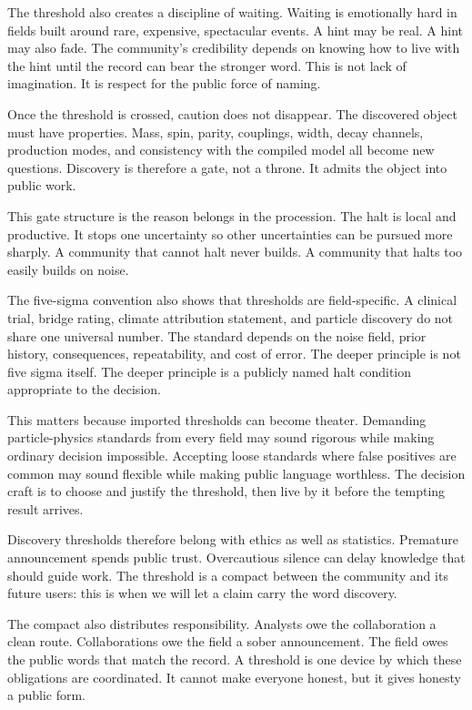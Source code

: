 The threshold also creates a discipline of waiting. Waiting is emotionally
hard in fields built around rare, expensive, spectacular events. A hint may
be real. A hint may also fade. The community's credibility depends on knowing
how to live with the hint until the record can bear the stronger word. This
is not lack of imagination. It is respect for the public force of naming.

Once the threshold is crossed, caution does not disappear. The discovered
object must have properties. Mass, spin, parity, couplings, width, decay
channels, production modes, and consistency with the compiled model all
become new questions. Discovery is therefore a gate, not a throne. It admits
the object into public work.

This gate structure is the reason  belongs in the procession.
The halt is local and productive. It stops one uncertainty so other
uncertainties can be pursued more sharply. A community that cannot halt never
builds. A community that halts too easily builds on noise.

The five-sigma convention also shows that thresholds are field-specific. A
clinical trial, bridge rating, climate attribution statement, and particle
discovery do not share one universal number. The standard depends on the
noise field, prior history, consequences, repeatability, and cost of error.
The deeper principle is not five sigma itself. The deeper principle is a
publicly named halt condition appropriate to the decision.

This matters because imported thresholds can become theater. Demanding
particle-physics standards from every field may sound rigorous while making
ordinary decision impossible. Accepting loose standards where false positives
are common may sound flexible while making public language worthless. The
decision craft is to choose and justify the threshold, then live by it before
the tempting result arrives.

Discovery thresholds therefore belong with ethics as well as statistics.
Premature announcement spends public trust. Overcautious silence can delay
knowledge that should guide work. The threshold is a compact between the
community and its future users: this is when we will let a claim carry the
word discovery.

The compact also distributes responsibility. Analysts owe the collaboration a
clean route. Collaborations owe the field a sober announcement. The field
owes the public words that match the record. A threshold is one device by
which these obligations are coordinated. It cannot make everyone honest, but
it gives honesty a public form.

